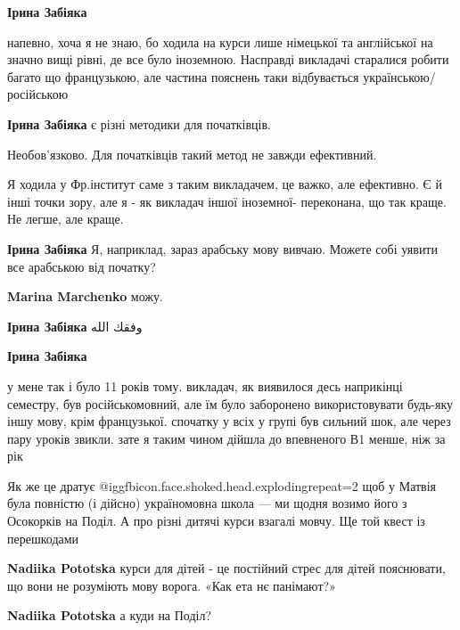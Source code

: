 \begin{itemize}
\begin{itemize} %
\textbf{Ірина Забіяка} 

напевно, хоча я не знаю, бо ходила на курси лише німецької та англійської на
значно вищі рівні, де все було іноземною. Насправді викладачі старалися робити
багато що французькою, але частина пояснень таки відбувається
українською/російською

\textbf{Ірина Забіяка} є різні методики для початківців.

Необов'язково. Для початківців такий метод не завжди ефективний.


Я ходила у Фр.інститут саме з таким викладачем, це важко, але ефективно. Є й
інші точки зору, але я - як викладач іншої іноземної- переконана, що так краще.
Не легше, але краще.


\textbf{Ірина Забіяка} Я, наприклад, зараз арабську мову вивчаю. Можете собі уявити все арабською від початку?

\textbf{Marina Marchenko} можу.

\textbf{Ірина Забіяка} وفقك الله

\textbf{Ірина Забіяка} 

у мене так і було 11 років тому. викладач, як виявилося десь наприкінці
семестру, був російськомовний, але їм було заборонено використовувати будь-яку
іншу мову, крім французької. спочатку у всіх у групі був сильний шок, але через
пару уроків звикли. зате я таким чином дійшла до впевненого В1 менше, ніж за
рік

\end{itemize} %


Як же це дратує  @igg{fbicon.face.shoked.head.exploding}{repeat=2}  щоб у Матвія була повністю (і дійсно) україномовна школа —
ми щодня возимо його з Осокорків на Поділ. А про різні дитячі курси взагалі
мовчу. Ще той квест із перешкодами

\begin{itemize} %
\textbf{Nadiika Pototska} курси для дітей - це постійний стрес для дітей пояснювати, що вони не розуміють мову ворога. «Как ета нє панімают?»

\textbf{Nadiika Pototska} а куди на Поділ?
\end{itemize} %


\end{itemize}
